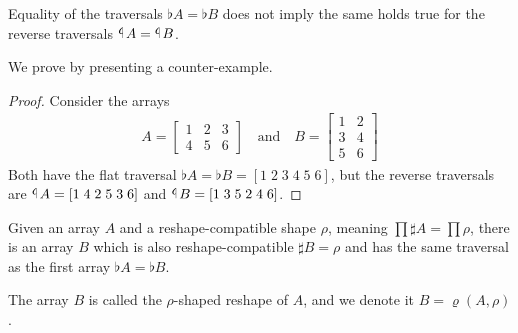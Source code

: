 \documentclass{DIKU-report-variant}
\newcommand\tlaf{\mathop{\rotatebox[origin=c]{180}{$\flat$}}}
\begin{document}
\begin{theorem}
  Equality of the traversals
  \(\flat A = \flat B\) does not imply the same holds true
  for the reverse traversals \(\tlaf A = \tlaf B\).

  We prove by presenting a counter-example.
\end{theorem}
\begin{proof}
  Consider the arrays
  \begin{align*}
    A =
    \begin{bmatrix}
      1 & 2 & 3 \\
      4 & 5 & 6
    \end{bmatrix}
    \quad\text{and}\quad
    B =
    \begin{bmatrix}
      1 & 2 \\
      3 & 4 \\
      5 & 6
    \end{bmatrix}
  \end{align*}
  Both have the flat traversal \(\flat A = \flat B = [1\; 2\; 3\; 4\; 5\; 6]\),
  but the reverse traversals are \(\tlaf A = [1\; 4\; 2\; 5\; 3\; 6]\) and
  \(\tlaf B = [1\; 3\; 5\; 2\; 4\; 6]\).
\end{proof}

\begin{definition}
  \label{def:reshape}
  Given an array \(A\) and a reshape-compatible shape \(\rho\), meaning \(\prod \sharp A = \prod\rho\),
  there is an array \(B\) which is also reshape-compatible \(\sharp B = \rho\) and
  has the same traversal as the first array \(\flat A = \flat B\).
  
  The array \(B\) is called the \(\rho\)-shaped reshape of \(A\), and we denote
  it \(B = \varrho(A, \rho)\).
\end{definition}
\end{document}
